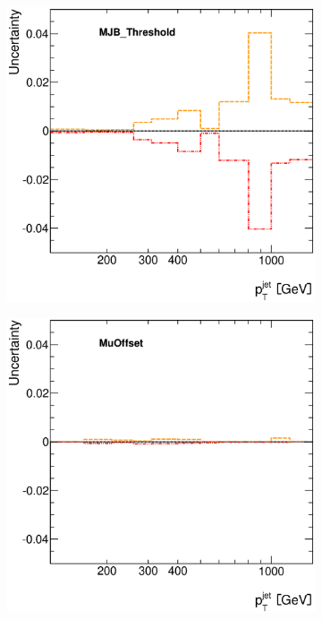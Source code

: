 \documentclass[12pt, twoside]{article}
\numberwithin{equation}{section}
\numberwithin{figure}{section}
\newenvironment{changemargin}[2]{%
\begin{list}{}{%
\setlength{\topsep}{0pt}%
\setlength{\leftmargin}{#1}%
\setlength{\rightmargin}{#2}%
\setlength{\listparindent}{\parindent}%
\setlength{\itemindent}{\parindent}%
\setlength{\parsep}{\parskip}%
}%
\item[]}{\end{list}}
\begin{document}
\begin{figure}[H]
\begin{changemargin}{-1.0cm}{-0.75cm}
\begin{changemargin}{-0.75cm}{-1.0cm}
        \begin{subfigure}[b]{0.25\textwidth}
            \includegraphics[width=\textwidth]{./images/JetSystematics/JetSystematic-37.eps}
        \end{subfigure}
        \begin{subfigure}[b]{0.25\textwidth}
            \includegraphics[width=\textwidth]{./images/JetSystematics/JetSystematic-38.eps}

\end{subfigure}
\end{changemargin}
\end{changemargin}
\end{figure}
\end{document}
